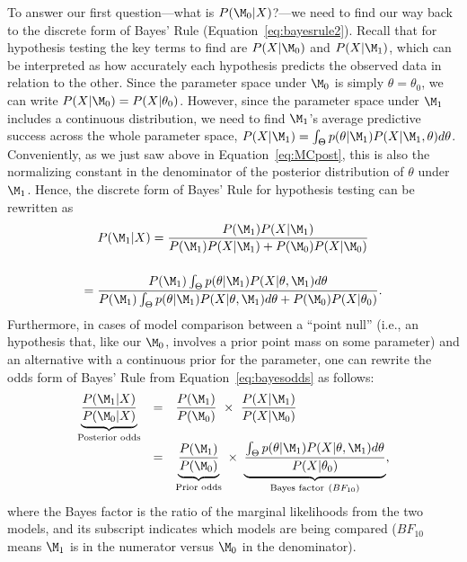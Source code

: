 To answer our first question---what is $P(\M_0|X)$?---we need to find our way back to the discrete form of Bayes' Rule (Equation~\ref{eq:bayesrule2}). Recall that for hypothesis testing the key terms to find are $P(X|\M_0)$ and $P(X|\M_1)$, which can be interpreted as how accurately each hypothesis predicts the observed data in relation to the other. Since the parameter space under $\M_0$ is simply $\theta=\theta_0$, we can write $P(X|\M_0) = P(X|\theta_0)$. However, since the parameter space under $\M_1$ includes a continuous distribution, we need to find $\M_1$'s average predictive success across the whole parameter space, $P(X|\M_1)=\int_\Theta p(\theta|\M_1)P(X|\M_1,\theta)d\theta$. Conveniently, as we just saw above in Equation~\ref{eq:MCpost}, this is also the normalizing constant in the denominator of the posterior distribution of $\theta$ under $\M_1$. Hence, the discrete form of Bayes' Rule for hypothesis testing can be rewritten as
\begin{multline*}
P(\M_1|X)
=\dfrac{P(\M_1) P(X|\M_1)}{P(\M_1)P(X|\M_1)+P(\M_0)P(X|\M_0)}\\[3ex]
=\dfrac{P(\M_1) \int_\Theta p(\theta|\M_1)P(X|\theta,\M_1)d\theta}{P(\M_1)\int_\Theta p(\theta|\M_1)P(X|\theta,\M_1)d\theta+P(\M_0)P(X|\theta_0)}.
\end{multline*}
Furthermore, in cases of model comparison between a ``point null'' (i.e., an hypothesis that, like our $\M_0$, involves a prior point mass on some parameter) and an alternative with a continuous prior for the parameter, one can rewrite the odds form of Bayes' Rule from Equation~\ref{eq:bayesodds} as follows:
$$
\begin{array}{rcl}
\underbrace{\dfrac{P(\M_1|X)} {P(\M_0|X)}}_\text{Posterior odds} &=&
\dfrac{P(\M_1)}{P(\M_0)} \ \times \
\dfrac{P(X|\M_1)}{P(X|\M_0)}\\[3ex]
&=&
\underbrace{\frac{P(\M_1)}{P(\M_0)}}_\text{Prior odds} \ \times \
\underbrace{\frac{\int_\Theta p(\theta|\M_1)P(X|\theta,\M_1)d\theta}{P(X|\theta_0)}}_{\text{Bayes factor} ~(BF_{10})},
\end{array}
$$
where the Bayes factor is the ratio of the marginal likelihoods from the two models, and its subscript indicates which models are being compared ($BF_{10}$ means $\M_1$ is in the numerator versus $\M_0$ in the denominator).

